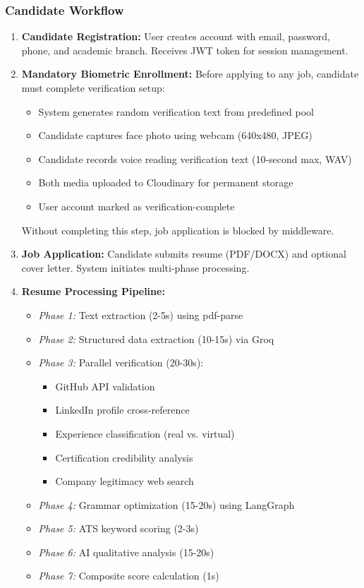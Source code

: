 \documentclass[conference]{IEEEtran}
\begin{document}
\subsubsection{Candidate Workflow}

\begin{enumerate}
    \item \textbf{Candidate Registration:} User creates account with email, password, phone, and academic branch. Receives JWT token for session management.
    
    \item \textbf{Mandatory Biometric Enrollment:} Before applying to any job, candidate must complete verification setup:
    \begin{itemize}
        \item System generates random verification text from predefined pool
        \item Candidate captures face photo using webcam (640x480, JPEG)
        \item Candidate records voice reading verification text (10-second max, WAV)
        \item Both media uploaded to Cloudinary for permanent storage
        \item User account marked as verification-complete
    \end{itemize}
    Without completing this step, job application is blocked by middleware.
    
    \item \textbf{Job Application:} Candidate submits resume (PDF/DOCX) and optional cover letter. System initiates multi-phase processing.
    
    \item \textbf{Resume Processing Pipeline:}
    \begin{itemize}
        \item \textit{Phase 1:} Text extraction (2-5s) using pdf-parse
        \item \textit{Phase 2:} Structured data extraction (10-15s) via Groq
        \item \textit{Phase 3:} Parallel verification (20-30s):
            \begin{itemize}
                \item GitHub API validation
                \item LinkedIn profile cross-reference
                \item Experience classification (real vs. virtual)
                \item Certification credibility analysis
                \item Company legitimacy web search
            \end{itemize}
        \item \textit{Phase 4:} Grammar optimization (15-20s) using LangGraph
        \item \textit{Phase 5:} ATS keyword scoring (2-3s)
        \item \textit{Phase 6:} AI qualitative analysis (15-20s)
        \item \textit{Phase 7:} Composite score calculation (1s)
    \end{itemize}
    

\end{enumerate}
\end{document}
